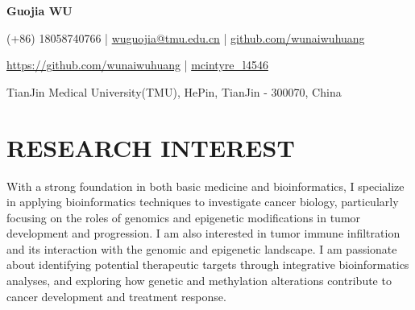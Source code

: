 \documentclass[a4paper,11pt]{article}
\newcommand{\socialicon}[1]{\raisebox{-0.05em}{\resizebox{!}{1em}{#1}}}
\newcommand{\headerfontiii}{\fontfamily{ppl}\selectfont} %
\begin{document}
\begin{justify}
\headerfontiii

\begin{center}
    {\Huge\textbf{Guojia WU}}
\end{center}
\vspace{-2mm}

\begin{center}
    \small{
    (+86) 18058740766 | \href{https://wuguojia@tmu.edu.cn}{wuguojia@tmu.edu.cn} | 
    \href{https://github.com/wunaiwuhuang}{github.com/wunaiwuhuang}
    }
\end{center}
\vspace{-8mm}

\begin{center}
    \small{
    \socialicon{\faGithub} \href{https://github.com/wunaiwuhuang}{https://github.com/wunaiwuhuang} | 
    \socialicon{\faTwitter} \href{https://x.com/mcintyre_l4546}{mcintyre\_l4546}
    }
\end{center}
\vspace{-7mm}
\begin{center}
    \small{TianJin Medical University(TMU), HePin, TianJin - 300070, China}
\end{center}

\vspace{-4mm}

\section{\large{\textbf{RESEARCH INTEREST}}}
\vspace{1mm}
{
With a strong foundation in both basic medicine and bioinformatics, I specialize in applying bioinformatics techniques to investigate cancer biology, particularly focusing on the roles of genomics and epigenetic modifications in tumor development and progression. I am also interested in tumor immune infiltration and its interaction with the genomic and epigenetic landscape. I am passionate about identifying potential therapeutic targets through integrative bioinformatics analyses, and exploring how genetic and methylation alterations contribute to cancer development and treatment response.
}
\vspace{-2mm}




\end{justify}
\end{document}
